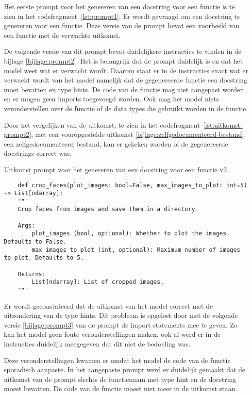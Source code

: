 Het eerste prompt voor het genereren van een docstring voor een functie is te zien in het codefragment~\ref{lst:prompt1}.
Er wordt gevraagd om een docstring te genereren voor een functie. Deze versie van de prompt bevat een voorbeeld van een functie met de verwachte uitkomst. 

De volgende versie van dit prompt bevat duidelijkere instructies te vinden in de bijlage \ref{bijlage:prompt2}.
Het is belangrijk dat de prompt duidelijk is en dat het model weet wat er verwacht wordt. 
Daarom staat er in de instructies exact wat er verwacht wordt van het model namelijk dat de gegenereerde functie een docstring moet bevatten en type hints.
De code van de functie mag niet aangepast worden en er mogen geen imports toegevoegd worden.
Ook mag het model niets veronderstellen over de functie of de data types die gebruikt worden in de functie.

Door het vergelijken van de uitkomst, te zien in het codefragment~\ref{lst:uitkomst-prompt2}, met een vooropgestelde uitkomst \ref{bijlage:zelfgedocumenteerd-bestand}, een zelfgedocumenteerd bestand, kan er gekeken worden of de gegenereerde docstrings correct was.
\begin{listing}
    \caption{Uitkomst prompt voor het genereren van een docstring voor een functie v2.}
    \label{lst:uitkomst-prompt2}
    \begin{verbatim}
    def crop_faces(plot_images: bool=False, max_images_to_plot: int=5) -> List[ndarray]:
    """
    Crop faces from images and save them in a directory.

    Args:
        plot_images (bool, optional): Whether to plot the images. Defaults to False.
        max_images_to_plot (int, optional): Maximum number of images to plot. Defaults to 5.

    Returns:
        List[ndarray]: List of cropped images.
    """
    \end{verbatim}
\end{listing}
Er wordt geconstateerd dat de uitkomst van het model correct met de uitzondering van de type hints. 
Dit probleem is opgelost door met de volgende versie \ref{bijlage:prompt3} van de prompt de import statements mee te geven.
Zo kan het model geen foute veronderstellingen maken, ook al werd er in de instructies duidelijk meegegeven dat dit niet de bedoeling was.

Deze veronderstellingen kwamen er omdat het model de code van de functie sporadisch aanpaste.
In het aangepaste prompt werd er duidelijk gemaakt dat de uitkomst van de prompt slechts de functienaam met type hint en de docstring moest bevatten.
De code van de functie moest niet meer in de uitkomst staan.

